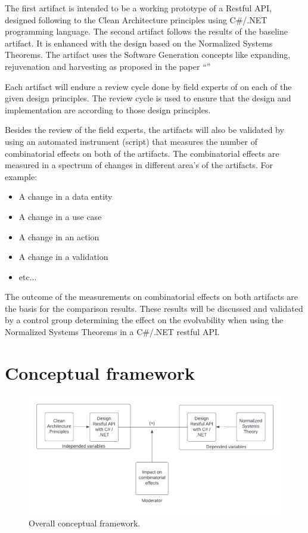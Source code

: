 The first artifact is intended to be a working prototype of a Restful API, designed
following to the Clean Architecture principles \parencite[]{martin_clean_2018} using
C\#/.NET programming language. The second artifact follows the results of the baseline
artifact. It is enhanced with the design based on the Normalized Systems Theorems. The
artifact uses the Software Generation concepts like expanding, rejuvenation and harvesting
as proposed in the paper \enquote{}
\parencite[]{mannaert_realization_2020}

Each artifact will endure a review cycle done by field experts of on each of the given
design principles. The review cycle is used to ensure that the design and implementation
are according to those design principles.

Besides the review of the field experts, the artifacts will also be validated by using an automated
instrument (script) that measures the number of combinatorial effects on both of the
artifacts. The combinatorial effects are measured in a spectrum of changes in different
area's of the artifacts. For example:
\begin{itemize}
    \item {A change in a data entity}
    \item {A change in a use case}
    \item {A change in an action}
    \item {A change in a validation}
    \item {etc...}
\end{itemize}

The outcome of the measurements on combinatorial effects on both artifacts are the basis
for the comparison results. These results will be discussed and validated by a control
group determining the effect on the evolvability when using the Normalized Systems
Theorems in a C\#/.NET restful API. 

\section{Conceptual framework}
\begin{figure}[!h]
    \centering
    \includegraphics[width=1\textwidth]{Figures/overall_conceptual_framework}
    \decoRule
    \caption[Overall conceptual framework]{Overall conceptual framework.}
    \label{fig:overall_conceptual_framework}
\end{figure}

